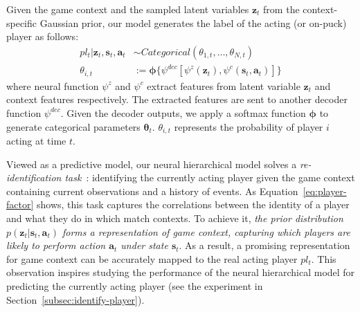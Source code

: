 \documentclass{article}
\newcommand{\context}{c}
\newcommand{\latentvariables}{\mathbf{z}}
\newcommand{\state}{\mathbf{s}}
\newcommand{\action}{\mathbf{a}}
\newcommand{\player}{pl}
\newcommand{\pindex}{i}
\newcommand{\prior}{p}
\newcommand{\softmax}{\boldsymbol{\phi}}
\newcommand{\BernoulliParameters}{\theta}
\begin{document}
Given the game context and the sampled latent variables $\latentvariables_{t}$ from the context-specific Gaussian prior, %
our model generates the label of the acting (or on-puck) player as follows:
\vspace{-0.05in}
\begin{align}
    \player_{t}| \latentvariables_{t}, \state_{t},\action_{t} &\sim Categorical(\BernoulliParameters_{1,t},\dots,\BernoulliParameters_{N,t})\\
    \BernoulliParameters_{\pindex,t}&:=\softmax\{\psi^{dec}[\psi^{z}(\latentvariables_{t}), \psi^{\context}(\state_{t},\action_{t})]\}
\end{align}
\vspace{-0.02in}
\noindent where neural function $\psi^{z}$ and $\psi^{c}$ extract features from latent variable $\latentvariables_{t}$ and context features respectively. The extracted features are sent to another decoder function $\psi^{dec}$. Given the decoder outputs, we apply a softmax function $\softmax$ to generate categorical parameters $\boldsymbol{\BernoulliParameters}_{t}$. $\BernoulliParameters_{\pindex,t}$ represents the probability of player $\pindex$ acting at time $t$. 


Viewed as a predictive model, our neural hierarchical model solves a {\em re-identification task}~\cite{LaviRID2018}: identifying the currently acting player given the game context containing current observations and a history of events. 
As Equation~\eqref{eq:player-factor} shows, this task captures the correlations between the identity of a player and what they do in which match contexts. To  achieve it, {\it the prior distribution $\prior(\latentvariables_{t}|\state_{t},\action_{t})$ forms a representation of game context, capturing which 
players are likely to perform action $\action_{t}$ under state $\state_{t}$}. As a result, a promising representation for game context can be accurately mapped to the real acting player $\player_{t}$.
This observation inspires studying the performance of the neural hierarchical model for predicting the currently acting player (see the experiment in Section~\ref{subsec:identify-player}).
\end{document}
